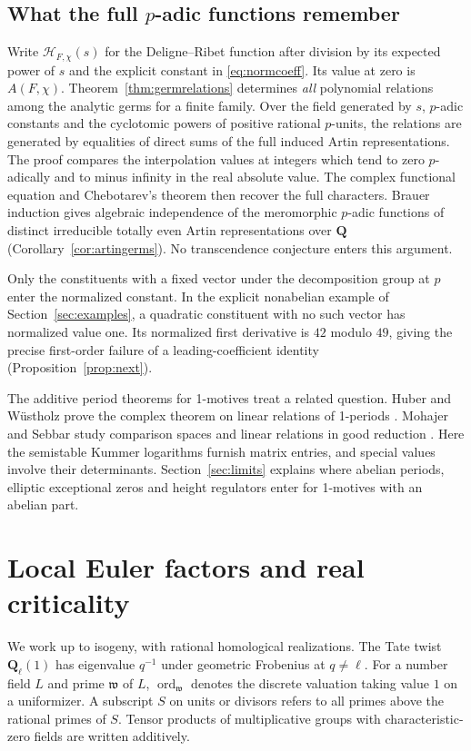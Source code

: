 \documentclass[11pt]{amsart}
\numberwithin{equation}{section}
\theoremstyle{definition}
\theoremstyle{remark}
\newcommand{\Q}{\mathbf Q}
\newcommand{\ord}{\operatorname{ord}}
\begin{document}
\subsection*{What the full \texorpdfstring{$p$}{p}-adic functions remember}
Write $\mathcal H_{F,\chi}(s)$ for the Deligne--Ribet function
after division by its expected power of $s$ and the explicit
constant in \eqref{eq:normcoeff}. Its value at zero is $A(F,\chi)$.
Theorem~\ref{thm:germrelations} determines \emph{all} polynomial
relations among the analytic germs for a finite family. Over the
field generated by $s$, $p$-adic constants and the cyclotomic powers
of positive rational $p$-units, the relations are generated by
equalities of direct sums of the full induced Artin representations.
The proof compares the interpolation values at integers which tend to
zero $p$-adically and to minus infinity in the real absolute value.
The complex functional equation and Chebotarev's theorem then
recover the full characters. Brauer induction gives algebraic
independence of the meromorphic $p$-adic functions of distinct
irreducible totally even Artin representations over $\Q$
(Corollary~\ref{cor:artingerms}). No transcendence conjecture enters
this argument.

Only the constituents with a fixed vector under the decomposition
group at $p$ enter the normalized constant. In the explicit
nonabelian example of Section~\ref{sec:examples}, a quadratic
constituent with no such vector has normalized value one. Its
normalized first derivative is $42$ modulo $49$, giving the precise first-order
failure of a leading-coefficient identity
(Proposition~\ref{prop:next}).

The additive period theorems for 1-motives treat a related question.
Huber and W\"ustholz prove the complex theorem on linear relations
of 1-periods \cite{HW}. Mohajer and Sebbar study comparison spaces and
linear relations in good reduction \cite{MS,MohajerThesis}. Here the
semistable Kummer logarithms furnish matrix entries, and special
values involve their determinants. Section~\ref{sec:limits} explains
where abelian periods, elliptic exceptional zeros and height
regulators enter for 1-motives with an abelian part.

\section{Local Euler factors and real criticality}
\label{sec:local}

We work up to isogeny, with rational homological realizations.
The Tate twist $\Q_\ell(1)$ has eigenvalue $q^{-1}$ under
geometric Frobenius at $q\ne\ell$. For a number field $L$ and
prime $\mathfrak w$ of $L$, $\ord_{\mathfrak w}$ denotes the
discrete valuation taking value $1$ on a uniformizer. A
subscript $S$ on units or divisors refers to all primes above
the rational primes of $S$. Tensor products of multiplicative
groups with characteristic-zero fields are written additively.
\end{document}
